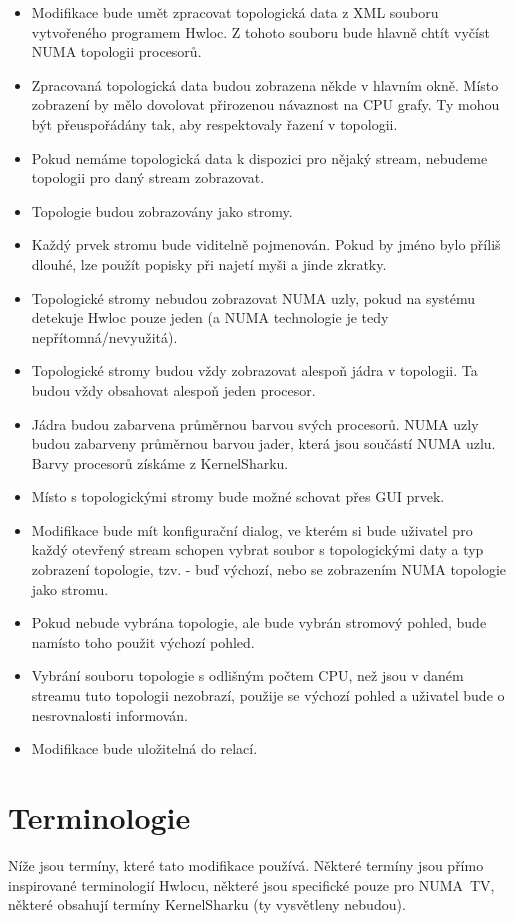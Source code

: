 \begin{itemize}
    \item Modifikace bude umět zpracovat topologická data z XML souboru vytvořeného programem Hwloc. Z tohoto souboru bude hlavně chtít vyčíst NUMA topologii procesorů.
    \item Zpracovaná topologická data budou zobrazena někde v hlavním okně. Místo zobrazení by mělo dovolovat přirozenou návaznost na CPU grafy. Ty mohou být přeuspořádány tak, aby respektovaly řazení v topologii.
    \item Pokud nemáme topologická data k dispozici pro nějaký stream, nebudeme topologii pro daný stream zobrazovat.
    \item Topologie budou zobrazovány jako stromy.
    \item Každý prvek stromu bude viditelně pojmenován. Pokud by jméno bylo příliš dlouhé, lze použít popisky při najetí myši a jinde zkratky.
    \item Topologické stromy nebudou zobrazovat NUMA uzly, pokud na systému detekuje Hwloc pouze jeden (a NUMA technologie je tedy nepřítomná/nevyužitá).
    \item Topologické stromy budou vždy zobrazovat alespoň jádra v topologii. Ta budou vždy obsahovat alespoň jeden procesor.
    \item Jádra budou zabarvena průměrnou barvou svých procesorů. NUMA uzly budou zabarveny průměrnou barvou jader, která jsou součástí NUMA uzlu. Barvy procesorů získáme z KernelSharku.
    \item Místo s topologickými stromy bude možné schovat přes GUI prvek.
    \item Modifikace bude mít konfigurační dialog, ve kterém si bude uživatel pro každý otevřený stream schopen vybrat soubor s topologickými daty a typ zobrazení topologie, tzv.  - buď výchozí, nebo se zobrazením NUMA topologie jako stromu.
    \item Pokud nebude vybrána topologie, ale bude vybrán stromový pohled, bude namísto toho použit výchozí pohled. 
    \item Vybrání souboru topologie s odlišným počtem CPU, než jsou v daném streamu tuto topologii nezobrazí, použije se výchozí pohled a uživatel bude o nesrovnalosti informován.
    \item Modifikace bude uložitelná do relací.
\end{itemize}

\section{Terminologie}
Níže jsou termíny, které tato modifikace používá. Některé termíny jsou přímo inspirované terminologií Hwlocu, některé jsou specifické pouze pro NUMA~TV, některé obsahují termíny KernelSharku (ty vysvětleny nebudou).

